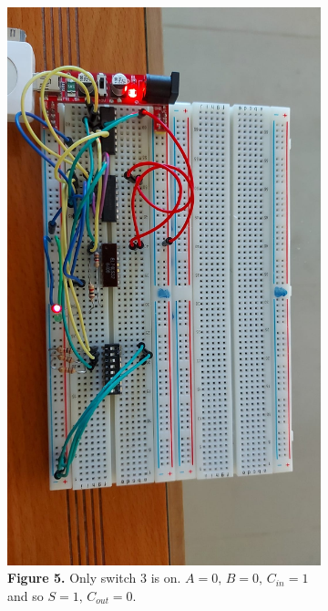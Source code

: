 \documentclass[a4paper]{article}
\begin{document}
\begin{figure}
     \centering
     \begin{subfigure}[b]{0.9\textwidth}
         \centering
          \includegraphics[angle=90, width=\textwidth]{3on.jpeg}
          \caption*{\textbf{Figure 5.} Only switch 3 is on. $A=0,\,B=0,\, C_{in} = 1$ and so $S=1,\,C_{out}=0$.\vspace{2em}}
         \label{fig:2on}
     \end{subfigure}
     \hfill
     \begin{subfigure}[b]{0.9\textwidth}

\end{subfigure}
\end{figure}
\end{document}
